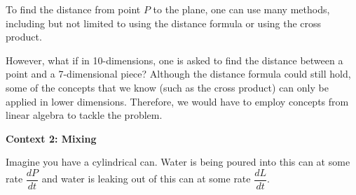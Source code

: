 \documentclass[12pt]{article}
\begin{document}
To find the distance from point $P$ to the plane, one can use many methods, including but not limited to using the distance formula or using the cross product. \par

\begin{center}
\end{center}

However, what if in 10-dimensions, one is asked to find the distance between a point and a 7-dimensional piece? Although the distance formula could still hold, some of the concepts that we know (such as the cross product) can only be applied in lower dimensions. Therefore, we would have to employ concepts from linear algebra to tackle the problem. 

\newpage

\textbf{Context 2: Mixing}

Imagine you have a cylindrical can. Water is being poured into this can at some rate $\dfrac{dP}{dt}$ and water is leaking out of this can at some rate $\dfrac{dL}{dt}$. \par
\end{document}
